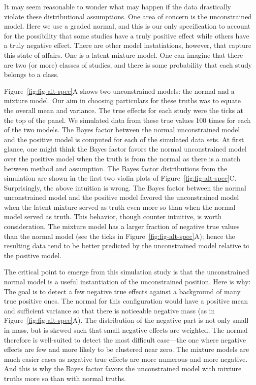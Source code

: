 \documentclass[english,man]{apa6}
\theoremstyle{definition}
\theoremstyle{definition}
\theoremstyle{remark}
\begin{document}
It may seem reasonable to wonder what may happen if the data drastically
violate these distributional assumptions. One area of concern is the
unconstrained model. Here we use a graded normal, and this is our only
specification to account for the possibility that some studies have a
truly positive effect while others have a truly negative effect. There
are other model instatiations, however, that capture this state of
affairs. One is a latent mixture model. One can imagine that there are
two (or more) classes of studies, and there is some probability that
each study belongs to a class.

Figure~\ref{fig:fig-alt-spec}A shows two unconstrained models: the
normal and a mixture model. Our aim in choosing particulars for these
truths was to equate the overall mean and variance. The true effects for
each study were the ticks at the top of the panel. We simulated data
from these true values 100 times for each of the two models. The Bayes
factor between the normal unconstrained model and the positive model is
computed for each of the simulated data sets. At first glance, one might
think the Bayes factor favors the normal unconstrained model over the
positive model when the truth is from the normal as there is a match
between method and assumption. The Bayes factor distributions from the
simulation are shown in the first two violin plots of
Figure~\ref{fig:fig-alt-spec}C. Surprisingly, the above intuition is
wrong. The Bayes factor between the normal unconstrained model and the
positive model favored the unconstrained model when the latent mixture
served as truth even more so than when the normal model served as truth.
This behavior, though counter intuitive, is worth consideration. The
mixture model has a larger fraction of negative true values than the
normal model (see the ticks in Figure~\ref{fig:fig-alt-spec}A); hence
the resulting data tend to be better predicted by the unconstrained
model relative to the positive model.

The critical point to emerge from this simulation study is that the
unconstrained normal model is a useful instantiation of the
unconstrained position. Here is why: The goal is to detect a few
negative true effects against a background of many true positive ones.
The normal for this configuration would have a positive mean and
sufficient variance so that there is noticeable negative mass (as in
Figure~\ref{fig:fig-alt-spec}A). The distribution of the negative part
is not only small in mass, but is skewed such that small negative
effects are weighted. The normal therefore is well-suited to detect the
most difficult case---the one where negative effects are few and more
likely to be clustered near zero. The mixture models are much easier
cases as negative true effects are more numerous and more negative. And
this is why the Bayes factor favors the unconstrained model with mixture
truths more so than with normal truths.
\end{document}
